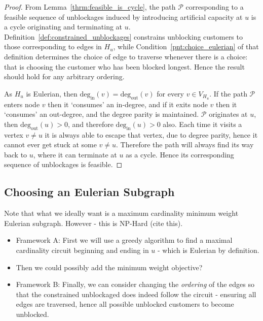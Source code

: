 \documentclass{article}
\begin{document}
\begin{proof}
From Lemma~\ref{thrm:feasible_is_cycle}, the path $\mathcal{P}$ corresponding to
a feasible sequence of unblockages induced by introducing artificial capacity at
$u$ is a cycle originating and terminating at $u$.
Definition~\ref{def:constrained_unblockages} constrains unblocking customers to
those corresponding to edges in $H_u$, while Condition~\ref{pnt:choice_eulerian}
of that definition determines the choice of edge to traverse whenever there is a
choice: that is choosing the customer who has been blocked longest.
Hence the result should hold for any arbitrary ordering.

As $H_u$ is Eulerian, then $\text{deg}_{\text{in}}(v)=\text{deg}_{\text{out}}(v)$
for every $v \in V_{H_u}$.
If the path $\mathcal{P}$ enters node $v$ then it `consumes' an in-degree, and
if it exits node $v$ then it `consumes' an out-degree, and the degree parity is
maintained.
$\mathcal{P}$ originates at $u$, then $\text{deg}_{\text{out}}(u) > 0$, and
therefore $\text{deg}_{\text{in}}(u) > 0$ also.
Each time it visits a vertex $v \neq u$ it is always able to escape that vertex,
due to degree parity, hence it cannot ever get stuck at some $v \neq u$.
Therefore the path will always find its way back to $u$, where it can terminate
at $u$ as a cycle.
Hence its corresponding sequence of unblockages is feasible.
\end{proof}

\subsection{Choosing an Eulerian Subgraph}
\begin{tcolorbox}[colback=orange!5!white,colframe=orange!75!black,title=TODO]
Note that what we ideally want is a maximum cardinality minimum weight Eulerian subgraph. However - this is NP-Hard (cite this).

\begin{itemize}
  \item Framework A: First we will use a greedy algorithm to find a maximal
  cardinality circuit beginning and ending in $u$ - which is Eulerian by
  definition.
  \item Then we could possibly add the minimum weight objective?
  \item Framework B: Finally, we can consider changing the \textit{ordering} of
  the edges so  that the constrained unblockaged does indeed follow the circuit
  - ensuring all edges are traversed, hence all possible unblocked customers to
  become unblocked.
\end{itemize}
\end{tcolorbox}
\end{document}

